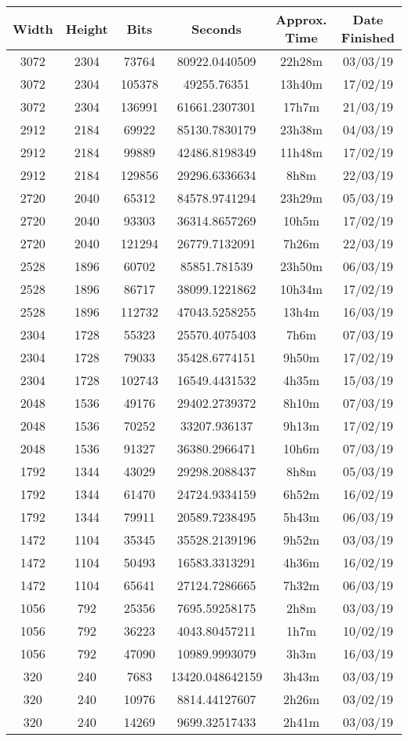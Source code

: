   \begin{center}
  \begin{tabular}{ c c c | c c c }
  Width & Height & Bits & Seconds & Approx. Time & Date Finished \\ \hline
  3072 & 2304 & 73764 & 80922.0440509 & 22h28m & 03/03/19 \\
  3072 & 2304 & 105378 & 49255.76351 & 13h40m & 17/02/19 \\
  3072 & 2304 & 136991 & 61661.2307301 & 17h7m & 21/03/19 \\
  2912 & 2184 & 69922 & 85130.7830179 & 23h38m & 04/03/19 \\
  2912 & 2184 & 99889 & 42486.8198349 & 11h48m & 17/02/19 \\
  2912 & 2184 & 129856 & 29296.6336634 & 8h8m & 22/03/19 \\
  2720 & 2040 & 65312 & 84578.9741294 & 23h29m & 05/03/19 \\
  2720 & 2040 & 93303 & 36314.8657269 & 10h5m & 17/02/19 \\
  2720 & 2040 & 121294 & 26779.7132091 & 7h26m & 22/03/19 \\
  2528 & 1896 & 60702 & 85851.781539 & 23h50m & 06/03/19 \\
  2528 & 1896 & 86717 & 38099.1221862 & 10h34m & 17/02/19 \\
  2528 & 1896 & 112732 & 47043.5258255 & 13h4m & 16/03/19 \\
  2304 & 1728 & 55323 & 25570.4075403 & 7h6m & 07/03/19 \\
  2304 & 1728 & 79033 & 35428.6774151 & 9h50m & 17/02/19 \\
  2304 & 1728 & 102743 & 16549.4431532 & 4h35m & 15/03/19 \\
  2048 & 1536 & 49176 & 29402.2739372 & 8h10m & 07/03/19 \\
  2048 & 1536 & 70252 & 33207.936137 & 9h13m & 17/02/19 \\
  2048 & 1536 & 91327 & 36380.2966471 & 10h6m & 07/03/19 \\
  1792 & 1344 & 43029 & 29298.2088437 & 8h8m & 05/03/19 \\
  1792 & 1344 & 61470 & 24724.9334159 & 6h52m & 16/02/19 \\
  1792 & 1344 & 79911 & 20589.7238495 & 5h43m & 06/03/19 \\
  1472 & 1104 & 35345 & 35528.2139196 & 9h52m & 03/03/19 \\
  1472 & 1104 & 50493 & 16583.3313291 & 4h36m & 16/02/19 \\
  1472 & 1104 & 65641 & 27124.7286665 & 7h32m & 06/03/19 \\
  1056 & 792 & 25356 & 7695.59258175 & 2h8m & 03/03/19 \\
  1056 & 792 & 36223 & 4043.80457211 & 1h7m & 10/02/19 \\
  1056 & 792 & 47090 & 10989.9993079 & 3h3m & 16/03/19 \\
  320 & 240 & 7683 & 13420.048642159 & 3h43m & 03/03/19 \\
  320 & 240 & 10976 & 8814.44127607 & 2h26m & 03/02/19 \\
  320 & 240 & 14269 & 9699.32517433 & 2h41m & 03/03/19 \\
  \end{tabular}
  \end{center}

